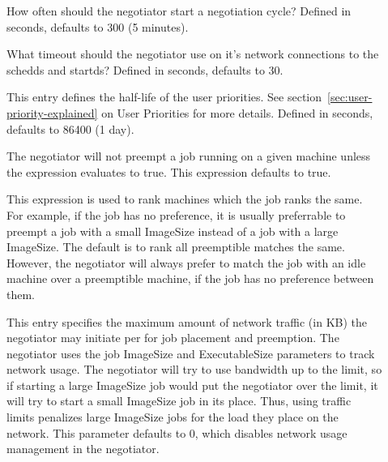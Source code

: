 \begin{description}
  
\item[] \label{param:NegotiatorInterval}
  How often should the negotiator start a negotiation cycle?  Defined
  in seconds, defaults to 300 (5 minutes).
  
\item[] \label{param:NegotiatorTimeout}
  What timeout should the negotiator use on it's network connections
  to the schedds and startds?  Defined in seconds, defaults to 30.
  
\item[] \label{param:PriorityHalfLife} This
  entry defines the half-life of the user priorities.  See
  section~\ref{sec:user-priority-explained}
  on User Priorities for more details.  Defined in seconds, defaults
  to 86400 (1 day).

\item[]
  \label{param:PreemptionRequirements} The negotiator will not preempt
  a job running on a given machine unless the
   expression evaluates to true.  This
  expression defaults to true.

\item[] \label{param:PreemptionRank} This
  expression is used to rank machines which the job ranks the same.
  For example, if the job has no preference, it is usually preferrable
  to preempt a job with a small ImageSize instead of a job with a
  large ImageSize.  The default is to rank all preemptible matches the
  same.  However, the negotiator will always prefer to match the job
  with an idle machine over a preemptible machine, if the job has no
  preference between them.

\item[]
  \label{param:NegotiatorTrafficLimit} This entry specifies the
  maximum amount of network traffic (in KB) the negotiator may
  initiate per  for job placement
  and preemption.  The negotiator uses the job ImageSize and
  ExecutableSize parameters to track network usage.  The negotiator
  will try to use bandwidth up to the limit, so if starting a large
  ImageSize job would put the negotiator over the limit, it will try
  to start a small ImageSize job in its place.  Thus, using traffic
  limits penalizes large ImageSize jobs for the load they place on the
  network.  This parameter defaults to 0, which disables network usage
  management in the negotiator.


\end{description}
